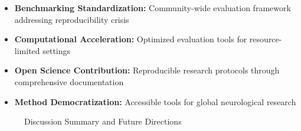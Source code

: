 \begin{itemize}
    \item \textbf{Benchmarking Standardization:} Community-wide evaluation framework addressing reproducibility crisis
    \item \textbf{Computational Acceleration:} Optimized evaluation tools for resource-limited settings
    \item \textbf{Open Science Contribution:} Reproducible research protocols through comprehensive documentation
    \item \textbf{Method Democratization:} Accessible tools for global neurological research
\end{itemize}

\begin{figure}[h]
\centering
\caption{Discussion Summary and Future Directions}
\label{fig:discussion_summary}
\end{figure}
